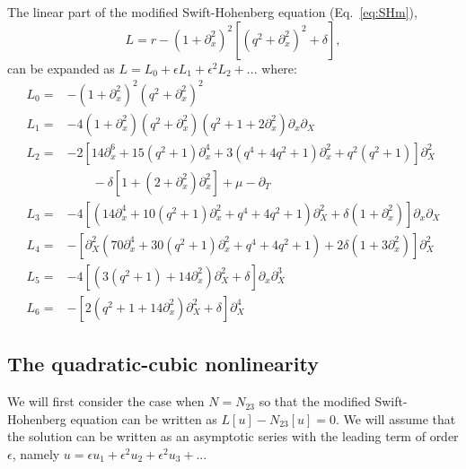 \documentclass[api,pof,pre,12pt,a4paper]{revtex4-1}
\newcommand{\beqn}{\begin{equation}}
\newcommand{\eeqn}{\end{equation}}
\begin{document}
The linear part of the modified Swift-Hohenberg equation (Eq.~\ref{eq:SHm}), 
\beqn
L= r-\left(1+\partial_{x}^2\right)^2 \left[\left(q^2+\partial_{x}^2\right)^2+\delta \right],
\eeqn
can be expanded as $L=L_0+\epsilon L_1+\epsilon^2 L_2+...$ where:
\begin{subequations}
\begin{align}
L_0 =& -\left(1+\partial_x^2\right)^2 \left(q^2+\partial_x^2\right)^2 \\
L_1 =& -4\left(1+\partial_x^2\right)  \left(q^2+\partial_x^2\right) \left(q^2+1+2 \partial_x^2\right)\partial_x\partial_X \\
L_2 =&- 2 \left[14 \partial_x^6+15  \left(q^2+1\right)\partial_x^4+3 \left(q^4+4 q^2+1\right) \partial_x^2+q^2\left(q^2+1\right)\right] \partial_X^2\nonumber\\  
& \qquad -\delta \left[1+ \left(2+\partial_x^2\right)\partial_x^2\right] +\mu -\partial_T \\
L_3 =& -4   \left[ \left(14 \partial_x^4+10  \left(q^2+1\right)\partial_x^2+q^4+ 4 q^2+1\right)\partial_X^2+\delta\left(1 +\partial_x^2\right)\right]\partial_x \partial_X \\
L_4 =& -\left[\partial_X^2 \left(70 \partial_x^4+30\left(q^2+1\right) \partial_x^2 +q^4 +4 q^2+1\right)+2 \delta\left(1 +3 \partial_x^2 \right) \right] \partial_X^2  \\
L_5=& -4  \left[ \left(3(q^2+1)+14 \partial_x^2\right)\partial_X^2+\delta \right]\partial_x \partial_X^3\\
L_6=& - \left[2 \left(q^2+1+14 \partial_x^2\right)\partial_X^2+\delta \right]\partial_X^4 
\end{align}
\end{subequations}


\subsection{The quadratic-cubic nonlinearity}
We will first consider the case when $N=N_{23}$ so that the modified Swift-Hohenberg equation can be written as $L[u]-N_{23}[u]=0$.  We will assume that the solution can be written as an asymptotic series with the leading term of order $\epsilon$, namely $u=\epsilon u_1 + \epsilon^2 u_2 +\epsilon^2 u_3+...$ 
\end{document}
